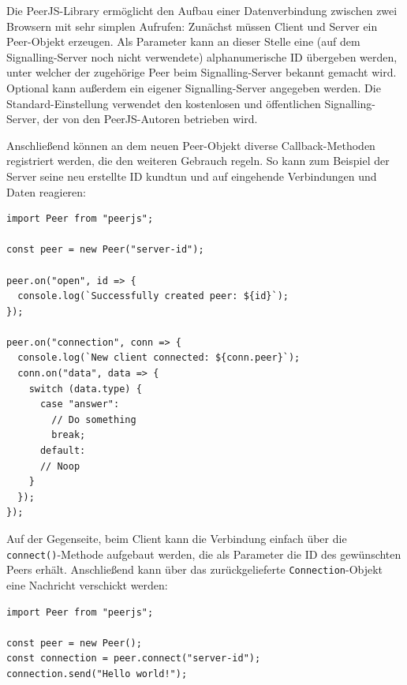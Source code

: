 Die PeerJS-Library ermöglicht den Aufbau einer Datenverbindung zwischen zwei Browsern mit sehr simplen Aufrufen: Zunächst müssen Client und Server ein Peer-Objekt erzeugen. Als Parameter kann an dieser Stelle eine (auf dem Signalling-Server noch nicht verwendete) alphanumerische ID übergeben werden, unter welcher der zugehörige Peer beim Signalling-Server bekannt gemacht wird. Optional kann außerdem ein eigener Signalling-Server angegeben werden. Die Standard-Einstellung verwendet den kostenlosen und öffentlichen Signalling-Server, der von den PeerJS-Autoren betrieben wird.

Anschließend können an dem neuen Peer-Objekt diverse Callback-Methoden registriert werden, die den weiteren Gebrauch regeln. So kann zum Beispiel der Server seine neu erstellte ID kundtun und auf eingehende Verbindungen und Daten reagieren:

\begin{minipage}{\linewidth}
\begin{lstlisting}[caption={Verbindungsaufbau mit der PeerJS-Bibliothek auf der Server-Seite. (aus: src/server/actions/server.js)}]
import Peer from "peerjs";

const peer = new Peer("server-id");

peer.on("open", id => {
  console.log(`Successfully created peer: ${id}`);
});

peer.on("connection", conn => {
  console.log(`New client connected: ${conn.peer}`);
  conn.on("data", data => {
    switch (data.type) {
      case "answer":
        // Do something
        break;
      default:
      // Noop
    }
  });
});
\end{lstlisting}
\end{minipage}

Auf der Gegenseite, beim Client kann die Verbindung einfach über die \texttt{connect()}-Methode aufgebaut werden, die als Parameter die ID des gewünschten Peers erhält. Anschließend kann über das zurückgelieferte \texttt{Connection}-Objekt eine Nachricht verschickt werden:

\begin{minipage}{\linewidth}
\begin{lstlisting}[caption={Verbindungsaufbau mit der PeerJS-Bibliothek auf der Client-Seite. (aus: src/client/actions/client.js)}]
import Peer from "peerjs";

const peer = new Peer();
const connection = peer.connect("server-id");
connection.send("Hello world!");
\end{lstlisting}
\end{minipage}

